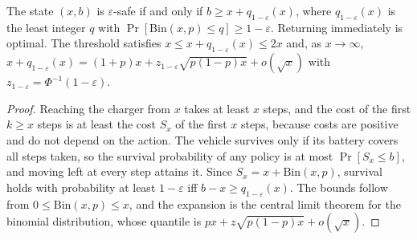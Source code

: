 \begin{newresult}\label{prop:vehicle-chance}
The state $(x,b)$ is $\varepsilon$-safe if and only if $b\ge x+q_{1-\varepsilon}(x)$, where $q_{1-\varepsilon}(x)$ is the least integer $q$ with $\Pr[\mathrm{Bin}(x,p)\le q]\ge1-\varepsilon$. Returning immediately is optimal. The threshold satisfies $x\le x+q_{1-\varepsilon}(x)\le2x$ and, as $x\to\infty$, $x+q_{1-\varepsilon}(x)=(1+p)x+z_{1-\varepsilon}\sqrt{p(1-p)x}+o(\sqrt x)$ with $z_{1-\varepsilon}=\Phi^{-1}(1-\varepsilon)$.
\end{newresult}
\begin{proof}
Reaching the charger from $x$ takes at least $x$ steps, and the cost of the first $k\ge x$ steps is at least the cost $S_x$ of the first $x$ steps, because costs are positive and do not depend on the action. The vehicle survives only if its battery covers all steps taken, so the survival probability of any policy is at most $\Pr[S_x\le b]$, and moving left at every step attains it. Since $S_x=x+\mathrm{Bin}(x,p)$, survival holds with probability at least $1-\varepsilon$ iff $b-x\ge q_{1-\varepsilon}(x)$. The bounds follow from $0\le\mathrm{Bin}(x,p)\le x$, and the expansion is the central limit theorem for the binomial distribution, whose quantile is $px+z\sqrt{p(1-p)x}+o(\sqrt x)$.
\end{proof}


